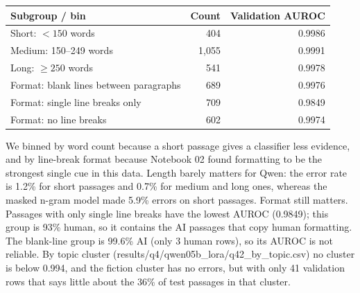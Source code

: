 \begin{tabularx}{\linewidth}{@{}Yrr@{}}\toprule Subgroup / bin & Count & Validation AUROC \\ \midrule
Short: $<150$ words & 404 & 0.9986 \\
Medium: 150--249 words & 1{,}055 & 0.9991 \\
Long: $\geq 250$ words & 541 & 0.9978 \\
\midrule
Format: blank lines between paragraphs & 689 & 0.9976 \\
Format: single line breaks only & 709 & 0.9849 \\
Format: no line breaks & 602 & 0.9974 \\
\bottomrule\end{tabularx}
\par\noindent
We binned by word count because a short passage gives a classifier less evidence, and by line-break format because Notebook 02 found formatting to be the strongest single cue in this data. Length barely matters for Qwen: the error rate is 1.2\% for short passages and 0.7\% for medium and long ones, whereas the masked n-gram model made 5.9\% errors on short passages. Format still matters. Passages with only single line breaks have the lowest AUROC (0.9849); this group is 93\% human, so it contains the AI passages that copy human formatting. The blank-line group is 99.6\% AI (only 3 human rows), so its AUROC is not reliable. By topic cluster (results/q4/qwen05b\_lora/q42\_by\_topic.csv) no cluster is below 0.994, and the fiction cluster has no errors, but with only 41 validation rows that says little about the 36\% of test passages in that cluster.

